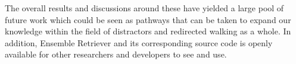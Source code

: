 The overall results and discussions around these have yielded a large pool of future work which could be seen as pathways that can be taken to expand our knowledge within the field of distractors and redirected walking as a whole. In addition, Ensemble Retriever and its corresponding source code is openly available for other researchers and developers to see and use. 


\hypersetup{pageanchor=false}